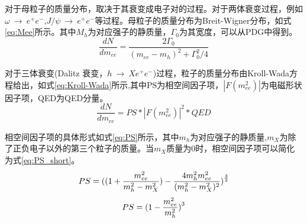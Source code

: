 对于母粒子的质量分布，取决于其衰变成电子对的过程。对于两体衰变过程，例如$\omega~\rightarrow~e^+e^-$,$J/\psi~\rightarrow~e^+e^-$等过程。母粒子的质量分布为Breit-Wigner分布，如式\ref{eq:Mee}所示。其中$M_h$为对应强子的静质量，$\Gamma_0$为其宽度，可以从PDG中得到。
\begin{equation}
    \label{eq:Mee}
    \frac{dN}{dm_{ee}} = \frac{ 2\Gamma_0 }{ (m_{ee}-m_h)^2 + \Gamma^2_0 / 4 } 
\end{equation}

对于三体衰变(Dalitz 衰变，$h~\rightarrow~Xe^+e^-$)过程，粒子的质量分布由Kroll-Wada方程给出，如式\ref{eq:Kroll-Wada}所示,其中PS为相空间因子项，$|F(m^2_{ee})|$为电磁形状因子项，QED为QED分量。
\begin{equation}
    \label{eq:Kroll-Wada}
    \frac{dN}{dm_{ee}} = PS*|F(m^2_{ee})|^2*QED
\end{equation}


相空间因子项的具体形式如式\ref{eq:PS}所示，其中$m_h$为对应强子的静质量,$m_X$为除了正负电子以外的第三个粒子的质量。当$m_X$质量为0时，相空间因子项可以简化为式\ref{eq:PS_short}。
\begin{equation}
    \label{eq:PS}
    PS = {\LARGE(} {\Large(} 1 + \frac{ m^2_{ee} }{ m^2_h - m^2_X } {\Large)} - \frac{ 4 m^2_h m^2_{ee} }{ (m^2_h - m^2_X)^2 } {\LARGE)}^{\frac{3}{2}}
\end{equation}
\begin{equation}
    \label{eq:PS_short}
    PS = {\Large(} 1-\frac{m^2_{ee}}{m^2_h} {\Large)}^{3}
\end{equation}

